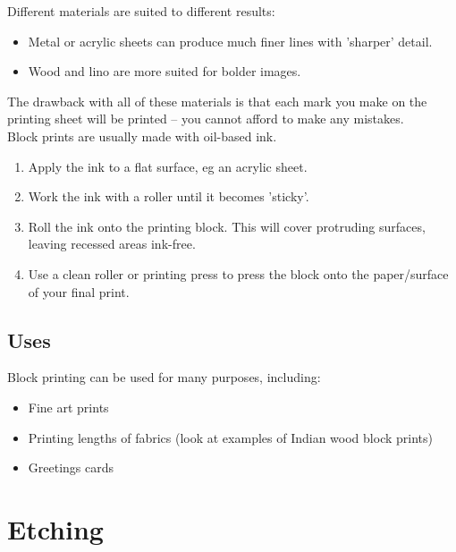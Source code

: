 \documentclass[a4paper,12pt]{article}
\begin{document}
Different materials are suited to different results:


\begin{itemize}
\item{Metal or acrylic sheets can produce much finer lines with 'sharper' detail.}
\item{Wood and lino are more suited for bolder images.}
\end{itemize}


The drawback with all of these materials is that each mark you make on the printing sheet will be printed – you cannot afford to make any mistakes.\\ 
Block prints are usually made with oil-based ink.

\begin{enumerate}
  \item Apply the ink to a flat surface, eg an acrylic sheet.
  \item Work the ink with a roller until it becomes 'sticky'.
  \item Roll the ink onto the printing block. This will cover protruding surfaces, leaving recessed areas ink-free.
  \item Use a clean roller or printing press to press the block onto the paper/surface of your final print.
\end{enumerate}

\subsection*{Uses}
Block printing can be used for many purposes, including:
\begin{itemize}
\item{Fine art prints}
\item{Printing lengths of fabrics (look at examples of Indian wood block prints)}
\item{Greetings cards}
\end{itemize}



\section{Etching}
\end{document}
